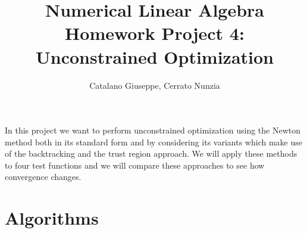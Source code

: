 \documentclass[a4paper,11pt]{article}
\begin{document}
	\author{Catalano Giuseppe, Cerrato Nunzia}
	\title{Numerical Linear Algebra Homework Project 4:\\Unconstrained Optimization}
	\date{}
	\maketitle
	
	\noindent In this project we want to perform unconstrained optimization using the Newton method both in its standard form and by considering its variants which make use of the backtracking and the trust region approach. We will apply these methods to four test functions and we will compare these approaches to see how convergence changes.
	
\section{Algorithms}
\end{document}
